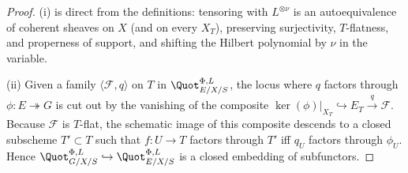 \begin{proof}
  
  (i) is direct from the definitions: tensoring with \(L^{\otimes \nu}\) is
  an autoequivalence of coherent sheaves on \(X\) (and on every \(X_T\)),
  preserving surjectivity, \(T\)-flatness, and properness of support, and
  shifting the Hilbert polynomial by \(\nu\) in the variable.

  (ii) Given a family \(\langle \mathcal{F}, q\rangle\) on \(T\) in
  \(\Quot^{\Phi,L}_{E/X/S}\), the locus where \(q\) factors through
  \(\phi : E \twoheadrightarrow G\) is cut out by the vanishing of the
  composite \(\ker(\phi)|_{X_T} \hookrightarrow E_T \xrightarrow{q}
  \mathcal{F}\). Because \(\mathcal{F}\) is \(T\)-flat, the schematic image of
  this composite descends to a closed subscheme \(T' \subset T\) such that
  \(f : U \to T\) factors through \(T'\) iff \(q_U\) factors through \(\phi_U\).
  Hence \(\Quot^{\Phi,L}_{G/X/S} \hookrightarrow \Quot^{\Phi,L}_{E/X/S}\)
  is a closed embedding of subfunctors.
\end{proof}

